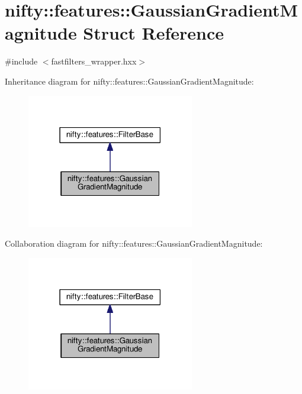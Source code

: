 \hypertarget{structnifty_1_1features_1_1GaussianGradientMagnitude}{}\section{nifty\+:\+:features\+:\+:Gaussian\+Gradient\+Magnitude Struct Reference}
\label{structnifty_1_1features_1_1GaussianGradientMagnitude}


{\ttfamily \#include $<$fastfilters\+\_\+wrapper.\+hxx$>$}



Inheritance diagram for nifty\+:\+:features\+:\+:Gaussian\+Gradient\+Magnitude\+:\nopagebreak
\begin{figure}[H]
\begin{center}
\leavevmode
\includegraphics[width=207pt]{structnifty_1_1features_1_1GaussianGradientMagnitude__inherit__graph}
\end{center}
\end{figure}


Collaboration diagram for nifty\+:\+:features\+:\+:Gaussian\+Gradient\+Magnitude\+:\nopagebreak
\begin{figure}[H]
\begin{center}
\leavevmode
\includegraphics[width=207pt]{structnifty_1_1features_1_1GaussianGradientMagnitude__coll__graph}
\end{center}
\end{figure}
